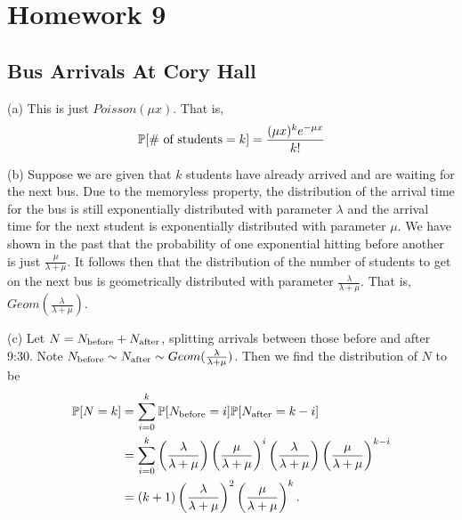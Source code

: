 \section{Homework 9}

\subsection{Bus Arrivals At Cory Hall}
(a) This is just $Poisson(\mu x)$. That is, 
\[
\P[\text{\# of students} = k] = \frac{(\mu x)^k e^{-\mu x}}{k!}
\]

(b) Suppose we are given that $k$ students have already arrived and are waiting for the next bus. Due to the memoryless property, the distribution of the arrival time for the bus is still exponentially distributed with parameter $\lambda$ and the arrival time for the next student is exponentially distributed with parameter $\mu$. We have shown in the past that the probability of one exponential hitting before another is just $\frac{\mu}{\lambda + \mu}$. It follows then that the distribution of the number of students to get on the next bus is geometrically distributed with parameter $\frac{\lambda}{\lambda + \mu}$. That is, $Geom\left(\frac{\lambda}{\lambda + \mu}\right)$.

(c) Let $N = N_{\f{before}} + N_{\f{after}}$, splitting arrivals between those before and after 9:30. Note $N_{\f{before}} \sim N_{\f{after}} \sim Geom(\frac{\lambda}{\lambda + \mu})$. Then we find the distribution of $N$ to be
\begin{align*}
    \P[N = k] &= \sum_{i = 0}^k\P[N_{\f{before}} = i]\P[N_{\f{after}} = k - i] \\
        &= \sum_{i = 0}^k\left(\frac{\lambda}{\lambda + \mu}\right)\left(\frac{\mu}{\lambda + \mu}\right)^i\left(\frac{\lambda}{\lambda + \mu}\right)\left(\frac{\mu}{\lambda + \mu}\right)^{k - i} \\
        &= (k + 1)\left(\frac{\lambda}{\lambda + \mu}\right)^2\left(\frac{\mu}{\lambda + \mu}\right)^k.
\end{align*}


